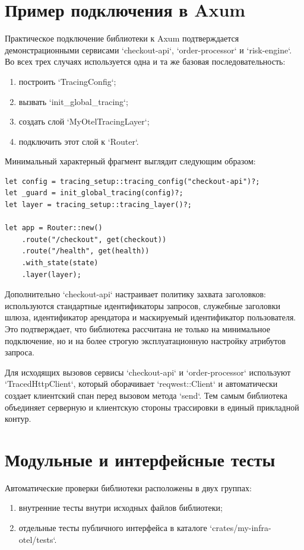\section{Пример подключения в Axum}

Практическое подключение библиотеки к Axum подтверждается демонстрационными
сервисами `checkout-api`, `order-processor` и `risk-engine`. Во всех трех
случаях используется одна и та же базовая последовательность:
\begin{enumerate}
    \item построить `TracingConfig`;
    \item вызвать `init_global_tracing`;
    \item создать слой `MyOtelTracingLayer`;
    \item подключить этот слой к `Router`.
\end{enumerate}

Минимальный характерный фрагмент выглядит следующим образом:

\begin{verbatim}
let config = tracing_setup::tracing_config("checkout-api")?;
let _guard = init_global_tracing(config)?;
let layer = tracing_setup::tracing_layer()?;

let app = Router::new()
    .route("/checkout", get(checkout))
    .route("/health", get(health))
    .with_state(state)
    .layer(layer);
\end{verbatim}

Дополнительно `checkout-api` настраивает политику захвата заголовков:
используются стандартные идентификаторы запросов, служебные заголовки шлюза,
идентификатор арендатора и маскируемый идентификатор пользователя. Это
подтверждает, что библиотека рассчитана не только на минимальное подключение,
но и на более строгую эксплуатационную настройку атрибутов запроса.

Для исходящих вызовов сервисы `checkout-api` и `order-processor` используют
`TracedHttpClient`, который оборачивает `reqwest::Client` и автоматически
создает клиентский спан перед вызовом метода `send`. Тем самым библиотека
объединяет серверную и клиентскую стороны трассировки в единый прикладной
контур.

\section{Модульные и интерфейсные тесты}

Автоматические проверки библиотеки расположены в двух группах:
\begin{enumerate}
    \item внутренние тесты внутри исходных файлов библиотеки;
    \item отдельные тесты публичного интерфейса в каталоге
    `crates/my-infra-otel/tests`.
\end{enumerate}

